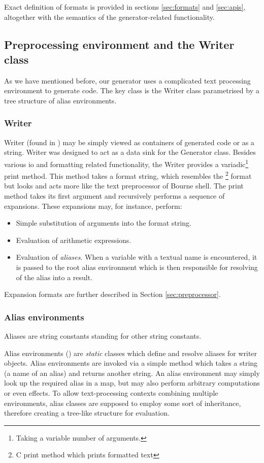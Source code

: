   Exact definition of formats is provided in sections \ref{sec:formats} and \ref{sec:apis}, altogether with the semantics of the generator-related functionality.

\subsection*{Preprocessing environment and the Writer class}

As we have mentioned before, our generator uses a complicated text processing environment to generate code. The key class is the Writer class parametrised by a tree structure of alias environments. 

\subsubsection{Writer}
Writer (found in ) may be simply viewed as containers of generated code or as a string. Writer was designed to act as a data sink for the Generator class. Besides various io and formatting related functionality, the Writer provides a variadic\footnote{Taking a variable number of arguments.} print method. This method takes a format string, which resembles the \footnote{C print method which prints formatted text} format but looks and acts more like the text preprocessor of Bourne shell. The print method takes its first argument and recursively performs a sequence of expansions. These expansions may, for instance, perform:
\begin{itemize}
  \item Simple substitution of arguments into the format string.
  \item Evaluation of arithmetic expressions. 
  \item Evaluation of \emph{aliases}. When a variable with a textual name is encountered, it is passed to the root alias environment which is then responsible for resolving of the alias into a result.
\end{itemize}

Expansion formats are further described in Section \ref{sec:preprocessor}.

\subsubsection{Alias environments}
Aliases are string constants standing for other string constants.

Alias environments () are \emph{static} classes which define and resolve aliases for writer objects. Alias environments are invoked via a simple method which takes a string (a name of an alias) and returns another string. An alias environment may simply look up the required alias in a map, but may also perform arbitrary computations or even effects. To allow text-processing contexts combining multiple environments, alias classes are supposed to employ some sort of inheritance, therefore creating a tree-like structure for evaluation. 

